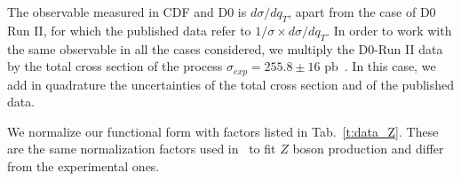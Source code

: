 \documentclass[aps,preprintnumbers,showpacs,nofootinbib,superscriptaddress,floatfix]{revtex4}
\begin{document}
The observable measured in CDF and D0 is $d\sigma /dq_T$,  apart from the case of D0 Run II, for which the published data refer to $1/\sigma \times d\sigma/dq_T$. In order to work with the same observable in all the cases considered, we multiply the D0-Run II data by the total cross section of the process $\sigma_{exp} = 255.8 \pm 16 \text{ pb}$~\cite{Abulencia:2005ix}. In this case, we add in quadrature the uncertainties of the total cross section and of the published data. 

We normalize our functional form with factors listed in Tab.~\ref{t:data_Z}. These are the same normalization factors used in~\cite{DAlesio:2014mrz} to fit $Z$ boson production and differ from the experimental ones. 



\renewcommand{\tabcolsep}{0.4pc} %
\renewcommand{\arraystretch}{1.3} %
\end{document}
